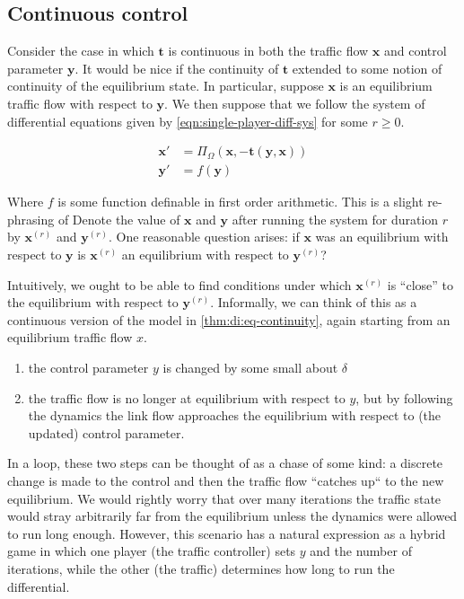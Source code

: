 \subsection{Continuous control}

Consider the case in which $\mathbf{t}$ is continuous in both the traffic flow $\mathbf{x}$ and control parameter $\mathbf{y}$.
It would be nice if the continuity of $\mathbf{t}$ extended to some notion of continuity of the equilibrium state.
In particular, suppose $\mathbf{x}$ is an equilibrium traffic flow with respect to $\mathbf{y}$.
We then suppose that we follow the system of differential equations given by \eqref{eqn:single-player-diff-sys} for some $r\geq 0$.

\begin{subequations}
\begin{align}
    \mathbf{x}' &= \Pi_{\Omega} (\mathbf{x}, -\mathbf{t}(\mathbf{y}, \mathbf{x}))\\
    \mathbf{y}' &= f(\mathbf{y})
\end{align}
\label{eqn:single-player-diff-sys}
\end{subequations}

Where $f$ is some function definable in first order arithmetic.
This is a slight re-phrasing of 
Denote the value of $\mathbf{x}$ and $\mathbf{y}$ after running the system for duration $r$ by $\mathbf{x}^{(r)}$ and $\mathbf{y}^{(r)}$.
One reasonable question arises: if $\mathbf{x}$ was an equilibrium with respect to $\mathbf{y}$ is $\mathbf{x}^{(r)}$ an equilibrium with respect to $\mathbf{y}^{(r)}$?

Intuitively, we ought to be able to find conditions under which $\mathbf{x}^{(r)}$ is ``close'' to the equilibrium with respect to $\mathbf{y}^{(r)}$.
Informally, we can think of this as a continuous version of the model in \cref{thm:di:eq-continuity}, again starting from an equilibrium traffic flow $x$.
\begin{enumerate}
    \item the control parameter $y$ is changed by some small about $\delta$
    \item the traffic flow is no longer at equilibrium with respect to $y$, but by following the dynamics the link flow approaches the equilibrium with respect to (the updated) control parameter.
\end{enumerate}
In a loop, these two steps can be thought of as a chase of some kind: a discrete change is made to the control and then the traffic flow ``catches up`` to the new equilibrium.
We would rightly worry that over many iterations the traffic state would stray arbitrarily far from the equilibrium unless the dynamics were allowed to run long enough.
However, this scenario has a natural expression as a hybrid game in which one player (the traffic controller) sets $y$ and the number of iterations, while the other (the traffic) determines how long to run the differential.

